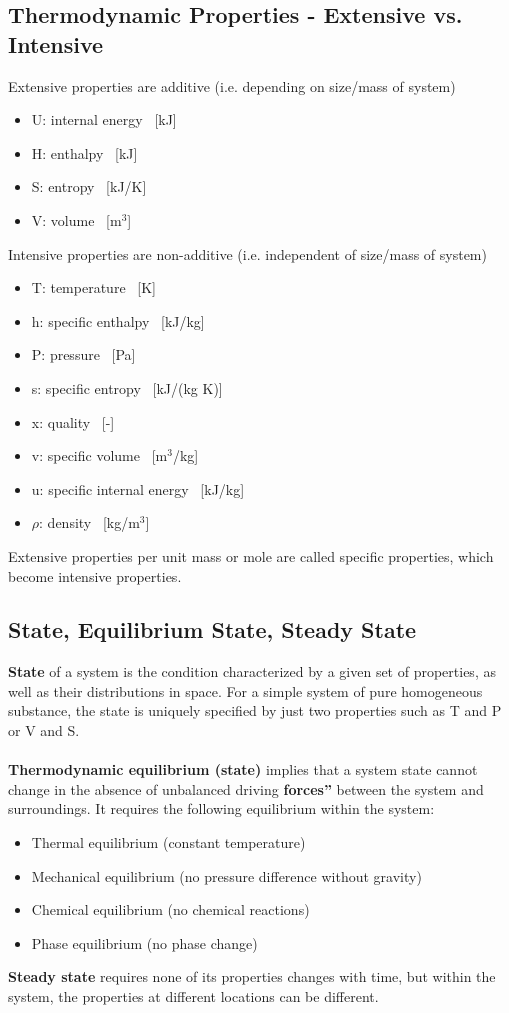 \documentclass[class=report, crop=false, 12pt,a4paper]{standalone}
\begin{document}
\subsection{Thermodynamic Properties - Extensive vs. Intensive}
Extensive properties are additive (i.e. depending on size/mass of system)
\begin{itemize}[noitemsep]
  \item U: internal energy \ [kJ] 
  \item H: enthalpy \ [kJ] 
  \item S: entropy \ [kJ/K]
  \item V: volume \ [$\si{\metre\cubed}$]
\end{itemize}
Intensive properties are non-additive (i.e. independent of size/mass of system)
\begin{itemize}[noitemsep]
  \item T: temperature \ [K] 
  \item h: specific enthalpy \ [kJ/kg]
  \item P: pressure \ [Pa] 
  \item s: specific entropy \ [kJ/(kg K)]
  \item x: quality \ [-] 
  \item v: specific volume \ [$\si{\metre\cubed}$/kg]
  \item u: specific internal energy \ [kJ/kg] 
  \item $\rho$: density \ [kg/$\si{\metre\cubed}$]
\end{itemize}
Extensive properties per unit mass or mole are called specific properties, which become intensive properties.
\subsection{State, Equilibrium State, Steady State}
\textbf{State} of a system is the condition characterized by a given set of properties, as well as their distributions in space. For a simple system of pure homogeneous substance, the state is uniquely specified by just two properties such as T and P or V and S. \\\\
\textbf{Thermodynamic equilibrium (state)} implies that a system state cannot change in the absence of unbalanced driving \textbf{forces”} between the system and surroundings. It requires the following equilibrium within the system: 
\begin{itemize}[noitemsep]
  \item Thermal equilibrium (constant temperature)
  \item Mechanical equilibrium (no pressure difference without gravity)
  \item Chemical equilibrium (no chemical reactions)
  \item Phase equilibrium (no phase change)
\end{itemize}
\textbf{Steady state} requires none of its properties changes with time, but within the system, the properties at different locations can be different.
\end{document}
